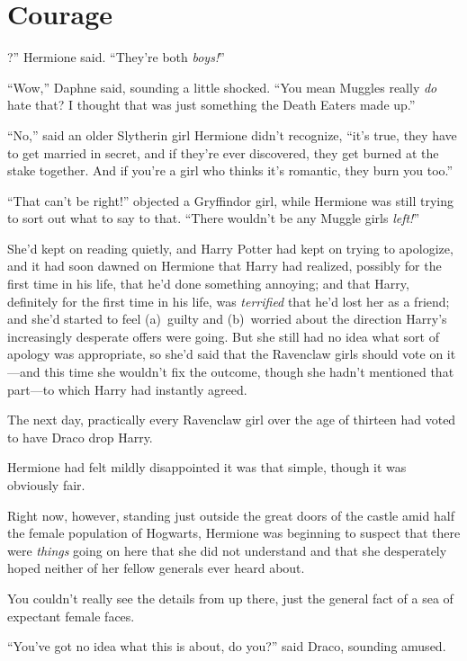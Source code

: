 \chapter{Courage}

?” Hermione said. “They’re both \emph{boys!}”

\quad\quad
“Wow,” Daphne said, sounding a little shocked. “You mean Muggles really
\emph{do} hate that? I thought that was just something the Death Eaters made
up.”

“No,” said an older Slytherin girl Hermione didn’t recognize, “it’s true, they
have to get married in secret, and if they’re ever discovered, they get burned
at the stake together. And if you’re a girl who thinks it’s romantic, they burn
you too.”

“That can’t be right!” objected a Gryffindor girl, while Hermione was still
trying to sort out what to say to that. “There wouldn’t be any Muggle girls
\emph{left!}”

She’d kept on reading quietly, and Harry Potter had kept on trying to
apologize, and it had soon dawned on Hermione that Harry had realized, possibly
for the first time in his life, that he’d done something annoying; and that
Harry, definitely for the first time in his life, was \emph{terrified} that
he’d lost her as a friend; and she’d started to feel (a)~guilty and (b)~worried
about the direction Harry’s increasingly desperate offers were going. But she
still had no idea what sort of apology was appropriate, so she’d said that the
Ravenclaw girls should vote on it—and this time she wouldn’t fix the outcome,
though she hadn’t mentioned that part—to which Harry had instantly agreed.

The next day, practically every Ravenclaw girl over the age of thirteen had
voted to have Draco drop Harry.

Hermione had felt mildly disappointed it was that simple, though it was
obviously fair.

Right now, however, standing just outside the great doors of the castle amid
half the female population of Hogwarts, Hermione was beginning to suspect that
there were \emph{things} going on here that she did not understand and that she
desperately hoped neither of her fellow generals ever heard about.

\later

You couldn’t really see the details from up there, just the general fact of a
sea of expectant female faces.

“You’ve got no idea what this is about, do you?” said Draco, sounding amused.

